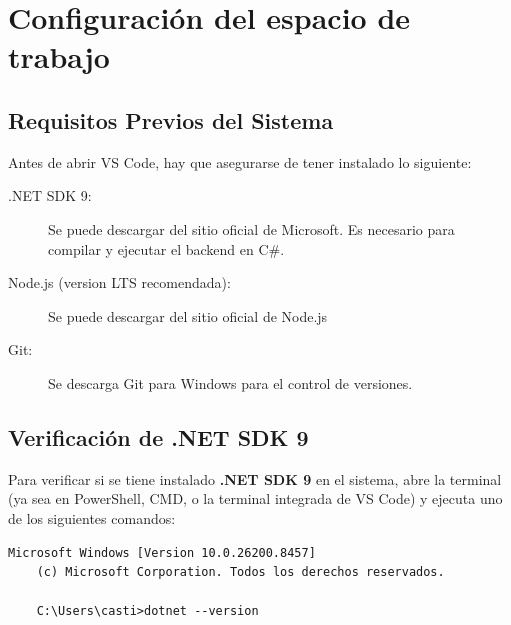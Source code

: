 \documentclass[
10pt, %
a4paper, %
oneside, %
headinclude,footinclude, %
BCOR5mm, %
]{scrartcl}
\begin{document}



\newpage %


\section{Configuración del espacio de trabajo}

\subsection{Requisitos Previos del Sistema}

Antes de abrir VS Code, hay que asegurarse de tener instalado lo siguiente:

\begin{description}
	\item[.NET SDK 9:] Se puede descargar del sitio oficial de Microsoft. Es necesario para compilar y ejecutar el backend en C\#.
	\item[Node.js (version LTS recomendada):] Se puede descargar del sitio oficial de Node.js
	\item[Git:] Se descarga Git para Windows para el control de versiones.
\end{description}

\subsection{Verificación de .NET SDK 9}
Para verificar si se tiene instalado \textbf{.NET SDK 9} en el sistema, abre la terminal (ya sea en PowerShell, CMD, o la terminal integrada de VS Code) y ejecuta uno de los siguientes comandos: 

\begin{lstlisting}[language=DOS]
	Microsoft Windows [Version 10.0.26200.8457]
	(c) Microsoft Corporation. Todos los derechos reservados.
	
	C:\Users\casti>dotnet --version
\end{lstlisting}
\end{document}

